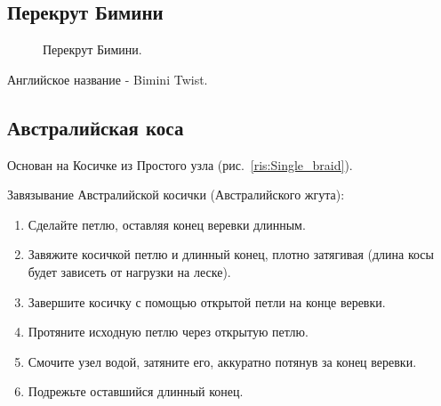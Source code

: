 \subsection{Перекрут Бимини}

\begin{figure}[H]\centering
	\subfloat[Завязывание]{\label{ris:Bimini_Twist_1}
	\tcbox[enhanced jigsaw,colframe=black,opacityframe=0.5,opacityback=0.5]
		{\centering
			}
		}
\end{figure}

\begin{figure}[H]\centering
	\subfloat[Завязывание]{\label{ris:Bimini_Twist_2}
	\tcbox[enhanced jigsaw,colframe=black,opacityframe=0.5,opacityback=0.5]
		{\centering
			}
		}
\end{figure}

\begin{figure}[H]\centering
	\subfloat[Результат]{\label{ris:Bimini_Twist_3}
	\tcbox[enhanced jigsaw,colframe=black,opacityframe=0.5,opacityback=0.5]
		{\centering
			}
		}
	\caption{Перекрут Бимини.}\label{ris:Bimini_Twist}
\end{figure}

Английское название - Bimini Twist.

\subsection{Австралийская коса}


Основан на Косичке из Простого узла (рис.~\ref{ris:Single_braid}).

Завязывание Австралийской косички (Австралийского жгута):

\begin{enumerate}
 \item Сделайте петлю, оставляя конец веревки длинным.
 \item Завяжите косичкой петлю и длинный конец, плотно затягивая (длина косы будет зависеть от нагрузки на леске).
 \item Завершите косичку с помощью открытой петли на конце веревки.
 \item Протяните исходную петлю через открытую петлю.
 \item Смочите узел водой, затяните его, аккуратно потянув за конец веревки.
 \item Подрежьте оставшийся длинный конец.
\end{enumerate}


